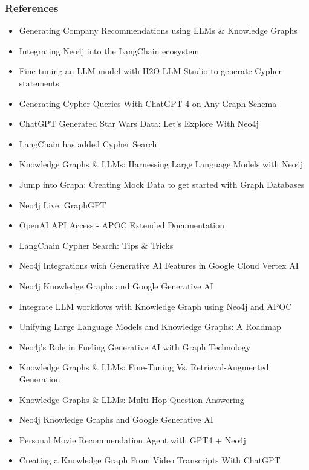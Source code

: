 \begin{frame}[fragile]\frametitle{References}
{\tiny 
\begin{itemize}
\item Generating Company Recommendations using LLMs \& Knowledge Graphs
\item Integrating Neo4j into the LangChain ecosystem
\item Fine-tuning an LLM model with H2O LLM Studio to generate Cypher statements
\item Generating Cypher Queries With ChatGPT 4 on Any Graph Schema
\item ChatGPT Generated Star Wars Data: Let's Explore With Neo4j
\item LangChain has added Cypher Search
\item Knowledge Graphs \& LLMs: Harnessing Large Language Models with Neo4j
\item Jump into Graph: Creating Mock Data to get started with Graph Databases
\item Neo4j Live: GraphGPT
\item OpenAI API Access - APOC Extended Documentation
\item LangChain Cypher Search: Tips \& Tricks
\item Neo4j Integrations with Generative AI Features in Google Cloud Vertex AI
\item Neo4j Knowledge Graphs and Google Generative AI
\item Integrate LLM workflows with Knowledge Graph using Neo4j and APOC
\item Unifying Large Language Models and Knowledge Graphs: A Roadmap
\item Neo4j’s Role in Fueling Generative AI with Graph Technology
\item Knowledge Graphs \& LLMs: Fine-Tuning Vs. Retrieval-Augmented Generation
\item Knowledge Graphs \& LLMs: Multi-Hop Question Answering
\item Neo4j Knowledge Graphs and Google Generative AI
\item Personal Movie Recommendation Agent with GPT4 + Neo4j
\item Creating a Knowledge Graph From Video Transcripts With ChatGPT
\end{itemize}
}
\end{frame}